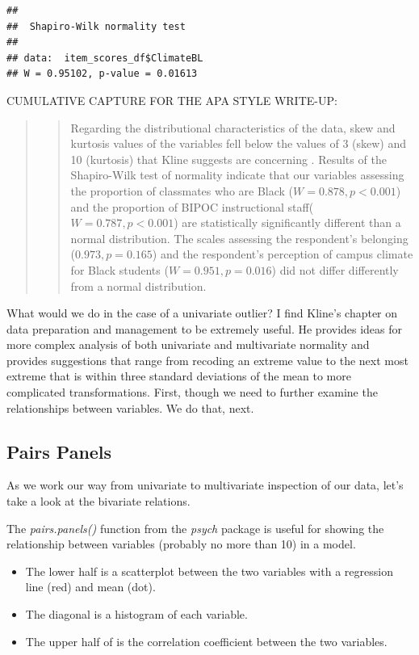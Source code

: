 \documentclass[
  11pt,
]{book}
\providecommand{\tightlist}{%
  \setlength{\itemsep}{0pt}\setlength{\parskip}{0pt}}
\begin{document}
\begin{verbatim}
## 
##  Shapiro-Wilk normality test
## 
## data:  item_scores_df$ClimateBL
## W = 0.95102, p-value = 0.01613
\end{verbatim}

CUMULATIVE CAPTURE FOR THE APA STYLE WRITE-UP:

\begin{quote}
\begin{quote}
Regarding the distributional characteristics of the data, skew and kurtosis values of the variables fell below the values of 3 (skew) and 10 (kurtosis) that Kline suggests are concerning \citeyearpar{kline_principles_2016}. Results of the Shapiro-Wilk test of normality indicate that our variables assessing the proportion of classmates who are Black (\(W = 0.878, p < 0.001\)) and the proportion of BIPOC instructional staff(\(W = 0.787, p < 0.001\)) are statistically significantly different than a normal distribution. The scales assessing the respondent's belonging (\(0.973, p = 0.165\)) and the respondent's perception of campus climate for Black students (\(W = 0.951, p = 0.016\)) did not differ differently from a normal distribution.
\end{quote}
\end{quote}

What would we do in the case of a univariate outlier? I find Kline's \citeyearpar{kline_principles_2016} chapter on data preparation and management to be extremely useful. He provides ideas for more complex analysis of both univariate and multivariate normality and provides suggestions that range from recoding an extreme value to the next most extreme that is within three standard deviations of the mean to more complicated transformations. First, though we need to further examine the relationships between variables. We do that, next.

\hypertarget{pairs-panels}{%
\subsection{Pairs Panels}\label{pairs-panels}}

As we work our way from univariate to multivariate inspection of our data, let's take a look at the bivariate relations.

The \emph{pairs.panels()} function from the \emph{psych} package is useful for showing the relationship between variables (probably no more than 10) in a model.

\begin{itemize}
\tightlist
\item
  The lower half is a scatterplot between the two variables with a regression line (red) and mean (dot).\\
\item
  The diagonal is a histogram of each variable.\\
\item
  The upper half of is the correlation coefficient between the two variables.
\end{itemize}
\end{document}
